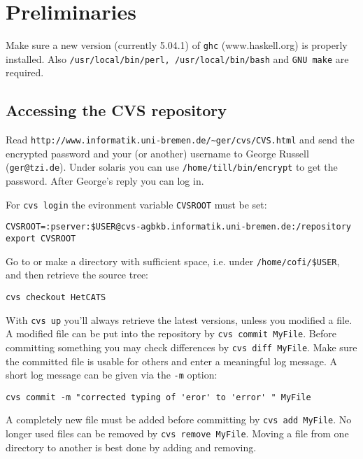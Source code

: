 \documentclass{article}
\begin{document}
\section{Preliminaries}

Make sure a new version (currently 5.04.1) of \texttt{ghc}
(www.haskell.org) is properly installed.  Also
\texttt{/usr/local/bin/perl, /usr/local/bin/bash} and \texttt{GNU
  make} are required.


\subsection{Accessing the CVS repository}

Read \texttt{http://www.informatik.uni-bremen.de/\~{}ger/cvs/CVS.html}
and send the encrypted password and your (or another) username to
George Russell (\texttt{ger@tzi.de}). Under solaris you can use
\texttt{/home/till/bin/encrypt} to get the password. After George's
reply you can log in. 

For \texttt{cvs login} the evironment variable \texttt{CVSROOT} must be set:

\begin{verbatim}
CVSROOT=:pserver:$USER@cvs-agbkb.informatik.uni-bremen.de:/repository
export CVSROOT
\end{verbatim}

Go to or make a directory with sufficient space, i.e. under
\texttt{/home/cofi/\$USER}, and then retrieve the source tree:

\begin{verbatim}
cvs checkout HetCATS
\end{verbatim}

With \texttt{cvs up} you'll always retrieve the latest versions,
unless you modified a file. A modified file can be put into the
repository by \texttt{cvs commit MyFile}. Before committing something
you may check differences by \texttt{cvs diff MyFile}. Make sure the
committed file is usable for others and enter a meaningful log
message. A short log message can be given via the \texttt{-m} option:

\begin{verbatim}
cvs commit -m "corrected typing of 'eror' to 'error' " MyFile
\end{verbatim}

A completely new file must be added before committing by \texttt{cvs
  add MyFile}.  No longer used files can be removed by \texttt{cvs
  remove MyFile}.  Moving a file from one directory to another is
best done by adding and removing.
\end{document}
